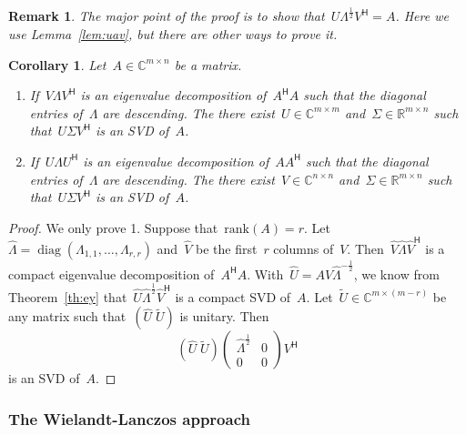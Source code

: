 \documentclass[11pt,a4paper]{article}  %
\numberwithin{equation}{section}
\newtheorem{corollary}{Corollary}%
\newtheorem{remark}{Remark}%
\theoremstyle{definition}
\def\RR{\mathbb{R}}
\def\CC{\mathbb{C}}
\newcommand{\hmt}{{\scriptscriptstyle{{\mathsf{H}}}}}
\newcommand{\rank}{\mathrm{rank}}
\newcommand{\diag}{\operatorname*{diag}}
\begin{document}
\begin{remark}
The major point of the proof is to show that~$U\Lambda^{\frac{1}{2}}V^\hmt =A$. Here we use
Lemma~\ref{lem:uav}, but there are other ways to prove it.
\end{remark}

\begin{corollary}
  \label{coro:eyfull}
  Let~$A \in \CC^{m\times n}$ be a matrix.
  \begin{enumerate}[leftmargin=1.5em]
    \item If~$V\Lambda V^\hmt$ is an eigenvalue decomposition of~$A^\hmt A$ such
      that the diagonal entries of~$\Lambda$ are descending. The there exist~$U\in \CC^{m\times m}$
      and~$\Sigma \in \RR^{m\times n}$ such that~$U\Sigma V^\hmt$ is an SVD of~$A$.
    \item If~$U\Lambda U^\hmt$ is an eigenvalue decomposition of~$AA^\hmt$ such
      that the diagonal entries of~$\Lambda$ are descending. The there exist~$V\in \CC^{n\times n}$
      and~$\Sigma \in \RR^{m\times n}$ such that~$U\Sigma V^\hmt$ is an SVD of~$A$.
  \end{enumerate}
\end{corollary}

\begin{proof}
  We only prove 1. Suppose that~$\rank(A) = r$. Let~$\hat{\Lambda} = \diag(\Lambda_{1,1}, \dots,
  \Lambda_{r,r})$ and~$\hat{V}$ be the first~$r$ columns of~$V$. Then~$\hat{V} \hat{\Lambda}
  \hat{V}^\hmt$ is a compact eigenvalue decomposition of~$A^\hmt A$. With~$\hat{U}
  = A\hat{V}\hat{\Lambda}^{-\frac{1}{2}}$, we know from Theorem~\ref{th:ey} that~$\hat{U}\hat{\Lambda}^{\frac{1}{2}}\hat{V}^\hmt$ is
  a compact SVD of~$A$.
  Let~$\tilde{U}\in \CC^{m\times(m-r)}$ be any matrix such that~$(\hat{U}\; \tilde{U})$ is
  unitary. Then
  \begin{equation*}
    (\hat{U}\; \tilde{U})
    \begin{pmatrix}
      \hat{\Lambda}^{\frac{1}{2}} & 0\\
      0 & 0
    \end{pmatrix}
    V^\hmt
  \end{equation*}
  is an SVD of~$A$.
\end{proof}

\subsubsection{The Wielandt-Lanczos approach~\cite{Lanczos_1958}}
\end{document}
